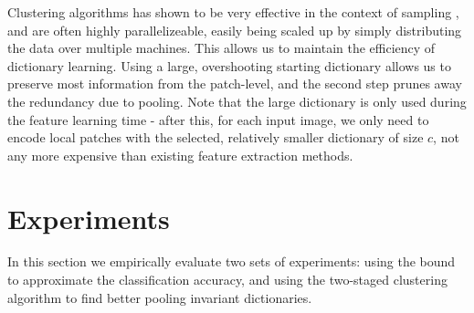 Clustering algorithms has shown to be very effective in the context of \nystrom sampling \cite{kumar2012sampling}, and are often highly parallelizeable, easily being scaled up by simply distributing the data over multiple machines. This allows us to maintain the efficiency of dictionary learning. Using a large, overshooting starting dictionary allows us to preserve most information from the patch-level, and the second step prunes away the redundancy due to pooling. Note that the large dictionary is only used during the feature learning time - after this, for each input image, we only need to encode local patches with the selected, relatively smaller dictionary of size $c$, not any more expensive than existing feature extraction methods.



\section{Experiments}\label{sec:sizematters:experiments}
In this section we empirically evaluate two sets of experiments: using the bound to approximate the classification accuracy, and using the two-staged clustering algorithm to find better pooling invariant dictionaries.

